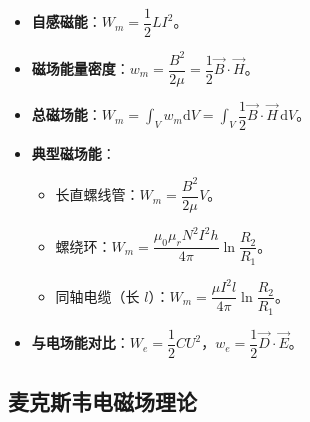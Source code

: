 \documentclass[12pt,a4paper]{ctexart}
\begin{document}
\begin{itemize}
    \item \textbf{自感磁能}：$W_m=\dfrac{1}{2}LI^2$。
    \item \textbf{磁场能量密度}：$w_m=\dfrac{B^2}{2\mu}=\dfrac{1}{2}\vec B\cdot\vec H$。
    \item \textbf{总磁场能}：$W_m=\displaystyle\int_V w_m\mathrm dV=\displaystyle\int_V\dfrac{1}{2}\vec B\cdot\vec H\,\mathrm dV$。
    \item \textbf{典型磁场能}：
    \begin{itemize}
        \item 长直螺线管：$W_m=\dfrac{B^2}{2\mu}V$。
        \item 螺绕环：$W_m=\dfrac{\mu_0\mu_r N^2 I^2 h}{4\pi}\ln\dfrac{R_2}{R_1}$。
        \item 同轴电缆（长 $l$）：$W_m=\dfrac{\mu I^2 l}{4\pi}\ln\dfrac{R_2}{R_1}$。
    \end{itemize}
    \item \textbf{与电场能对比}：$W_e=\dfrac{1}{2}CU^2$，$w_e=\dfrac{1}{2}\vec D\cdot\vec E$。
\end{itemize}

\subsection{麦克斯韦电磁场理论}
\end{document}
